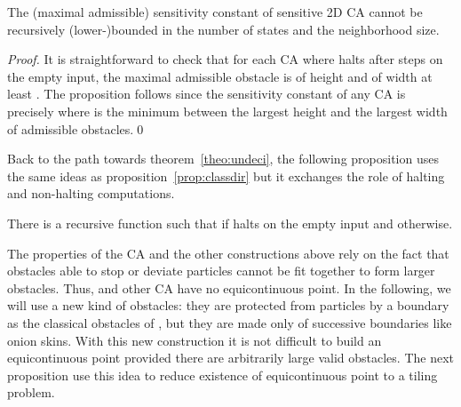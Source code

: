 \documentclass{llncs}
\begin{document}
\begin{proposition}
  \label{prop:constant}
  The (maximal admissible) sensitivity constant of sensitive 2D CA
  cannot be recursively (lower-)bounded in the number of states and
  the neighborhood size.
\end{proposition}
\begin{proof}
  It is straightforward to check that for each CA 
  where  halts after  steps on the empty input, the
  maximal admissible obstacle is of height  and of width at
  least . The proposition follows since the sensitivity
  constant of any CA  is precisely  where  is the minimum between the largest height and
  the largest width of admissible obstacles.\qed
\end{proof}

Back to the path towards theorem~\ref{theo:undeci}, the following
proposition uses the same ideas as proposition~\ref{prop:classdir} but
it exchanges the role of halting and non-halting computations.

\begin{proposition}
  \label{prop:classinv}
  There is a recursive function 
  such that  if  halts on the
  empty input and  otherwise.
\end{proposition}

The properties of the CA  and the other constructions above rely
on the fact that obstacles able to stop or deviate particles cannot be
fit together to form larger obstacles. Thus,  and other CA have
no equicontinuous point. In the following, we will use a new kind of
obstacles: they are protected from particles by a boundary as the
classical obstacles of , but they are made only of successive
boundaries like onion skins. With this new construction it is not
difficult to build an equicontinuous point provided there are
arbitrarily large valid obstacles. The next proposition use this idea
to reduce existence of equicontinuous point to a tiling problem.
\end{document}

